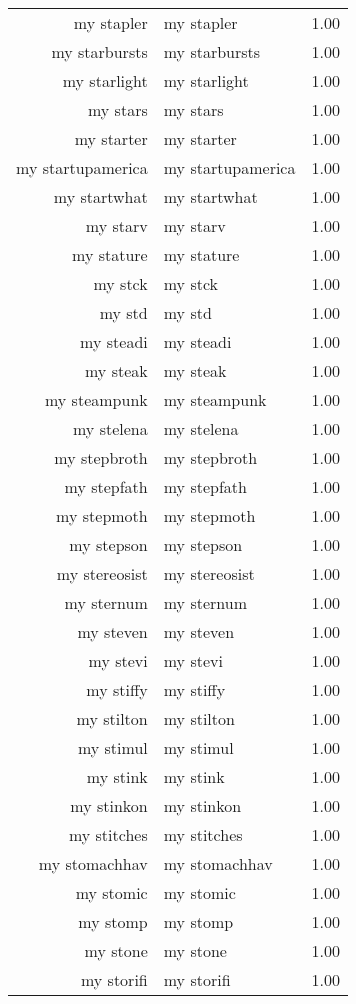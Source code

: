 \begin{table}[ht]
\begin{tabular}{rlr}
  my stapler & my stapler & 1.00 \\ 
  my starbursts & my starbursts & 1.00 \\ 
  my starlight & my starlight & 1.00 \\ 
  my stars & my stars & 1.00 \\ 
  my starter & my starter & 1.00 \\ 
  my startupamerica & my startupamerica & 1.00 \\ 
  my startwhat & my startwhat & 1.00 \\ 
  my starv & my starv & 1.00 \\ 
  my stature & my stature & 1.00 \\ 
  my stck & my stck & 1.00 \\ 
  my std & my std & 1.00 \\ 
  my steadi & my steadi & 1.00 \\ 
  my steak & my steak & 1.00 \\ 
  my steampunk & my steampunk & 1.00 \\ 
  my stelena & my stelena & 1.00 \\ 
  my stepbroth & my stepbroth & 1.00 \\ 
  my stepfath & my stepfath & 1.00 \\ 
  my stepmoth & my stepmoth & 1.00 \\ 
  my stepson & my stepson & 1.00 \\ 
  my stereosist & my stereosist & 1.00 \\ 
  my sternum & my sternum & 1.00 \\ 
  my steven & my steven & 1.00 \\ 
  my stevi & my stevi & 1.00 \\ 
  my stiffy & my stiffy & 1.00 \\ 
  my stilton & my stilton & 1.00 \\ 
  my stimul & my stimul & 1.00 \\ 
  my stink & my stink & 1.00 \\ 
  my stinkon & my stinkon & 1.00 \\ 
  my stitches & my stitches & 1.00 \\ 
  my stomachhav & my stomachhav & 1.00 \\ 
  my stomic & my stomic & 1.00 \\ 
  my stomp & my stomp & 1.00 \\ 
  my stone & my stone & 1.00 \\ 
  my storifi & my storifi & 1.00 \\ 

\end{tabular}
\end{table}
